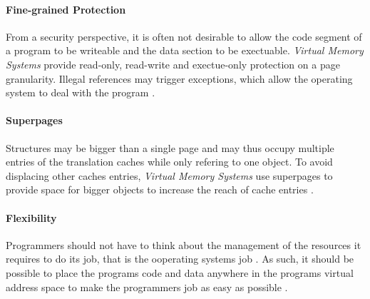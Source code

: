 \paragraph{Fine-grained Protection} From a security perspective, it is often not desirable to allow the code segment
of a program to be writeable and the data section to be exectuable. \textit{Virtual Memory Systems} provide read-only,
read-write and exectue-only protection on a page granularity\cite{jacobSoftwaremanagedAddressTranslation1997}.
Illegal references may trigger exceptions, which allow the operating system to deal with the program \cite{jacobVirtualMemoryContemporary1998}.


\paragraph{Superpages}
Structures may be bigger than a single page and may thus occupy multiple entries of the translation caches while
only refering to one object. To avoid displacing other caches entries, \textit{Virtual Memory Systems} use
superpages to provide space for bigger objects to increase the reach of cache entries \cite{jacobSoftwaremanagedAddressTranslation1997}.


\paragraph{Flexibility} Programmers should not have to think about the management
of the resources it requires to do its job, that is the ooperating systems job
\cite{tanenbaumOS}. As such, it should be possible to place the programs code
and data anywhere in the programs virtual address space to make the programmers
job as easy as possible
\cite{jacob1998virtualissues}. %

